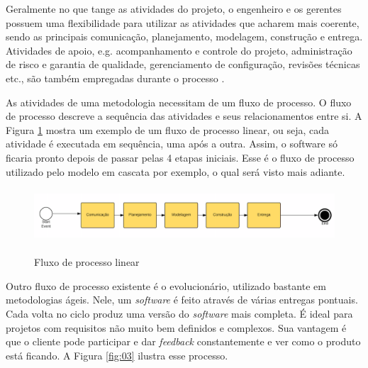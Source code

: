 
Geralmente no que tange as atividades do projeto, o engenheiro e os gerentes possuem uma flexibilidade para utilizar as atividades que acharem mais coerente, sendo as principais comunicação, planejamento, modelagem, construção e entrega. Atividades de apoio, e.g. acompanhamento e controle do projeto, administração de risco e garantia de qualidade, gerenciamento de configuração, revisões técnicas etc., são também empregadas durante o processo \cite{pressman:11}. 

As atividades de uma metodologia necessitam de um fluxo de processo. O fluxo de processo descreve a sequência das atividades e seus relacionamentos entre si. A Figura \ref{fig:02} mostra um exemplo de um fluxo de processo linear, ou seja, cada atividade é executada em sequência, uma após a outra. Assim, o software só ficaria pronto depois de passar pelas 4 etapas iniciais. Esse é o fluxo de processo utilizado pelo modelo em cascata por exemplo, o qual será visto mais adiante. 

\begin{figure}[htb!]
\begin{center}
\caption{Fluxo de processo linear}
\label{fig:02}
\includegraphics[height=2cm]{assets/linear} \\
\end{center}
\end{figure}


Outro fluxo de processo existente é o evolucionário, utilizado bastante em metodologias ágeis. Nele, um \textit{software} é feito através de várias entregas pontuais. Cada volta no ciclo produz uma versão do \textit{software} mais completa. É ideal para projetos com requisitos não muito bem definidos e complexos. Sua vantagem é que o cliente pode participar e dar \textit{feedback} constantemente e ver como o produto está ficando. A Figura \ref{fig:03} ilustra esse processo.

